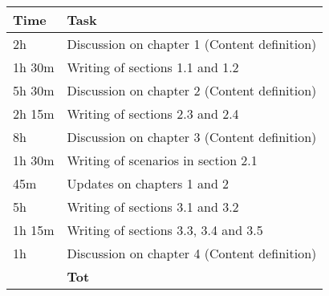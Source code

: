 \begin{center}
    {\renewcommand{\arraystretch}{2}%
    \begin{tabular}{L{2cm}L{12cm}}
        \hline
        \textbf{Time} & \textbf{Task} \\
        \hline
        2h & Discussion on chapter 1 (Content definition) \\
        \hline
        1h 30m & Writing of sections 1.1 and 1.2 \\
        \hline
        5h 30m & Discussion on chapter 2 (Content definition) \\
        \hline
        2h 15m & Writing of sections 2.3 and 2.4 \\
        \hline
        8h & Discussion on chapter 3 (Content definition) \\
        \hline
        1h 30m & Writing of scenarios in section 2.1 \\
        \hline
        45m & Updates on chapters 1 and 2 \\
        \hline
        5h & Writing of sections 3.1 and 3.2 \\
        \hline
        1h 15m & Writing of sections 3.3, 3.4 and 3.5 \\
        \hline
        1h & Discussion on chapter 4 (Content definition) \\
        \hline
        \textbf{} & \textbf{Tot} \\
    \end{tabular}}
\end{center}